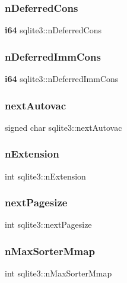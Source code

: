 \mbox{\label{structsqlite3_a1d74627daa6fe93811e99cffe9362c10}} 
\subsubsection{nDeferredCons}
{\footnotesize\ttfamily \textbf{ i64} sqlite3\+::n\+Deferred\+Cons}

\mbox{\label{structsqlite3_a784716abd1e79a084257ad5c6da7ebb5}} 
\subsubsection{nDeferredImmCons}
{\footnotesize\ttfamily \textbf{ i64} sqlite3\+::n\+Deferred\+Imm\+Cons}

\mbox{\label{structsqlite3_a39dac5c9296edb15a46c458fb273bb11}} 
\subsubsection{nextAutovac}
{\footnotesize\ttfamily signed char sqlite3\+::next\+Autovac}

\mbox{\label{structsqlite3_aa57fc38ef27d8fa59221cb5c0e54f7fb}} 
\subsubsection{nExtension}
{\footnotesize\ttfamily int sqlite3\+::n\+Extension}

\mbox{\label{structsqlite3_aceb220475d2e2fc37b8bf896128b1f1e}} 
\subsubsection{nextPagesize}
{\footnotesize\ttfamily int sqlite3\+::next\+Pagesize}

\mbox{\label{structsqlite3_a06a472c979f5535d3f04e3b3598adb9a}} 
\subsubsection{nMaxSorterMmap}
{\footnotesize\ttfamily int sqlite3\+::n\+Max\+Sorter\+Mmap}

